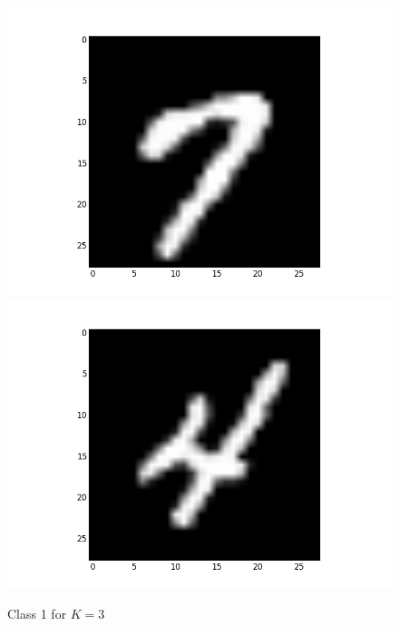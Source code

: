 \documentclass[submit]{harvardml}
\begin{document}
\begin{figure}[ht]
    \includegraphics[scale=0.15]{K3-representative-0-2}
    \includegraphics[scale=0.15]{K3-representative-0-3}
    \caption{Class 1 for $K=3$}
\end{figure}
\end{document}
